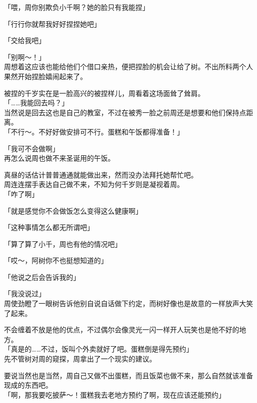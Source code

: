 「喂，周你别欺负小千啊？她的脸只有我能捏」

「行行你就帮我好好捏捏她吧」

「交给我吧」

「别啊～！」\\

周想着这应该也能给他们个借口亲热，便把捏脸的机会让给了树。不出所料两个人果然开始捏脸嬉闹起来了。

被捏的千岁实在是一脸高兴的被捏样儿，周看着这场面耸了耸肩。\\

「……我能回去吗？」\\

当然说是回去这也是自己的教室，不过在被秀一脸之前周还是想要和他们保持点距离。\\

「不行～。不好好做安排可不行。蛋糕和午饭都得准备！」

「我可不会做啊」\\

再怎么说周也做不来圣诞用的午饭。

真昼的话估计普普通通就能做出来，然而没办法拜托她帮忙吧。\\

周连连摆手表达自己做不来，不知为何千岁则是凝视着周。\\

「咋了啊」

「就是感觉你不会做饭怎么变得这么健康啊」

「这种事情怎么都无所谓吧」

「算了算了小千，周也有他的情况吧」

「哎～，阿树你不也挺想知道的」

「他说之后会告诉我的」

「我没说过」\\

周使劲瞪了一眼树告诉他别自说自话做下约定，而树好像也是故意的一样放声大笑了起来。

不会缠着不放是他的优点，不过偶尔会像灵光一闪一样开人玩笑也是他不好的地方。\\

「真是的……不过，饭叫个外卖就好了吧。蛋糕倒是得先预约」\\

先不管树对周的窥探，周拿出了一个现实的建议。

要说当然也是当然，周自己又做不出蛋糕，而且饭菜也做不来，那么自然就该准备现成的东西吧。\\

「啊，那我要吃披萨～！蛋糕我去老地方预约了啊，现在应该还能预约」

